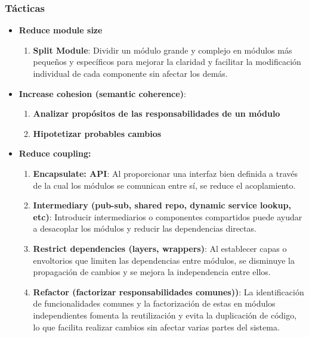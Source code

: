 \documentclass{article}
\begin{document}
		\subsubsection{Tácticas}
		\begin{itemize}		
			\item \textbf{Reduce module size}
			\begin{enumerate}
				\item \textbf{Split Module}: Dividir un módulo grande y complejo en módulos más pequeños y específicos para mejorar la claridad y facilitar la modificación individual de cada componente sin afectar los demás.
				
			\end{enumerate}
			
			\item \textbf{Increase cohesion (semantic coherence)}:
			\begin{enumerate}
				\item \textbf{Analizar propósitos de las
					responsabilidades de un módulo}
				
				\item \textbf{Hipotetizar probables cambios}
				
			\end{enumerate}	
			
			\item \textbf{Reduce coupling:}
			\begin{enumerate}
				\item \textbf{Encapsulate: API}: Al proporcionar una interfaz bien definida a través de la cual los módulos se comunican entre sí, se reduce el acoplamiento.
				
				\item \textbf{Intermediary (pub-sub, shared repo, dynamic service lookup, etc)}: Introducir intermediarios o componentes compartidos puede ayudar a desacoplar los módulos y reducir las dependencias directas.
				
					
				\item \textbf{Restrict dependencies (layers, wrappers)}: Al establecer capas o envoltorios que limiten las dependencias entre módulos, se disminuye la propagación de cambios y se mejora la independencia entre ellos.
					
				\item \textbf{Refactor (factorizar responsabilidades comunes))}: La identificación de funcionalidades comunes y la factorización de estas en módulos independientes fomenta la reutilización y evita la duplicación de código, lo que facilita realizar cambios sin afectar varias partes del sistema.
					

\end{enumerate}
\end{itemize}
\end{document}
